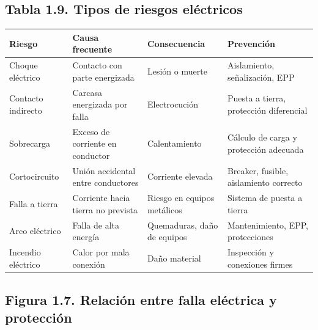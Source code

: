 \documentclass[
  spanish,
  letterpaper,
  DIV=11,
  numbers=noendperiod]{scrreprt}
\newcounter{none} %
\begin{document}
\subsection{Tabla 1.9. Tipos de riesgos
eléctricos}\label{tabla-1.9.-tipos-de-riesgos-eluxe9ctricos}

{\def\LTcaptype{none} %
\begin{longtable}[]{@{}
  >{\raggedright\arraybackslash}p{}
  >{\raggedright\arraybackslash}p{}
  >{\raggedright\arraybackslash}p{}
  >{\raggedright\arraybackslash}p{}@{}}
\toprule\noalign{}
\begin{minipage}[b]{\linewidth}\raggedright
Riesgo
\end{minipage} & \begin{minipage}[b]{\linewidth}\raggedright
Causa frecuente
\end{minipage} & \begin{minipage}[b]{\linewidth}\raggedright
Consecuencia
\end{minipage} & \begin{minipage}[b]{\linewidth}\raggedright
Prevención
\end{minipage} \\
\midrule\noalign{}
\endhead
\bottomrule\noalign{}
\endlastfoot
Choque eléctrico & Contacto con parte energizada & Lesión o muerte &
Aislamiento, señalización, EPP \\
Contacto indirecto & Carcasa energizada por falla & Electrocución &
Puesta a tierra, protección diferencial \\
Sobrecarga & Exceso de corriente en conductor & Calentamiento & Cálculo
de carga y protección adecuada \\
Cortocircuito & Unión accidental entre conductores & Corriente elevada &
Breaker, fusible, aislamiento correcto \\
Falla a tierra & Corriente hacia tierra no prevista & Riesgo en equipos
metálicos & Sistema de puesta a tierra \\
Arco eléctrico & Falla de alta energía & Quemaduras, daño de equipos &
Mantenimiento, EPP, protecciones \\
Incendio eléctrico & Calor por mala conexión & Daño material &
Inspección y conexiones firmes \\
\end{longtable}
}

\subsection{Figura 1.7. Relación entre falla eléctrica y
protección}\label{figura-1.7.-relaciuxf3n-entre-falla-eluxe9ctrica-y-protecciuxf3n}
\end{document}
